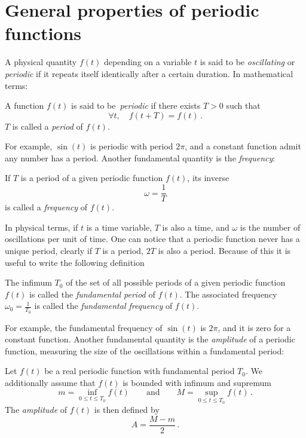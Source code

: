 \section{General properties of periodic functions}
A physical quantity $f(t)$ depending on a variable $t$ is said to be \emph{oscillating} or
\emph{periodic} if it repeats itself identically after a certain duration. In mathematical
terms:
\begin{definition}
  A function $f(t)$ is said to be~\emph{periodic} if there exists $T>0$ such that
  \begin{equation}
    \forall t,\quad f(t+T)=f(t)\,.
  \end{equation}
  $T$ is called a \emph{period} of $f(t)$.
\end{definition}
\noindent For example, $\sin(t)$ is periodic with period $2\pi$, and a constant function
admit any number has a period. Another fundamental quantity is the \emph{frequency}:
\begin{definition}
  If $T$ is a period of a given periodic function $f(t)$, its inverse
  \begin{equation}
    \omega=\frac{1}{T}
  \end{equation}
  is called a \emph{frequency} of $f(t)$.
\end{definition}
\noindent In physical terms, if $t$ is a time variable, $T$ is also a time, and $\omega$
is the number of oscillations per unit of time. One can notice that a periodic function
never has a unique period, \eg clearly if $T$ is a period, $2T$ is also a period. Because
of this it is useful to write the following definition
\begin{definition}
  The infimum $T_0$ of the set of all possible periods of a given periodic function $f(t)$
  is called the \emph{fundamental period} of $f(t)$. The associated frequency
  $\omega_0=\frac{1}{T_0}$ is called the \emph{fundamental frequency} of $f(t)$.
\end{definition}
\noindent For example, the fundamental frequency of $\sin(t)$ is $2\pi$, and it is zero
for a constant function. Another fundamental quantity is the \emph{amplitude} of a
periodic function, measuring the size of the oscillations within a fundamental period:
\begin{definition}
  \label{def:amplitude}
  Let $f(t)$ be a real periodic function with fundamental period $T_0$. We additionally
  assume that $f(t)$ is bounded with infimum and supremum
  \begin{equation}
    m=\inf_{0\leq t\leq T_0}f(t)\qquad\text{and}\qquad M=\sup_{0\leq t\leq T_0}f(t)\,.
  \end{equation}
  The \emph{amplitude} of $f(t)$ is then defined by
  \begin{equation}
    A=\frac{M-m}{2}\,.
  \end{equation}
\end{definition}
